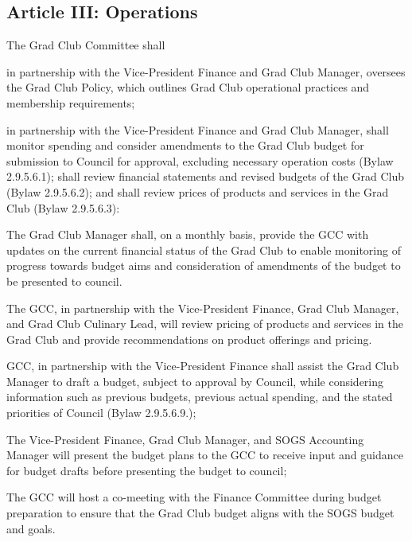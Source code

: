 \subsection{Article III: Operations}
\begin{longenum}[ label*=\thesubsection.\arabic*., align=left] 
\item The Grad Club Committee shall
	\begin{longenum}[ label*=\arabic*., align=left]
	\item in partnership with the Vice-President Finance and Grad Club Manager, oversees the Grad Club Policy, which outlines Grad Club operational practices and membership requirements;
	\item in partnership with the Vice-President Finance and Grad Club Manager, shall monitor spending and consider amendments to the Grad Club budget for submission to Council for approval, excluding necessary operation costs (Bylaw 2.9.5.6.1); shall review financial statements and revised budgets of the Grad Club (Bylaw 2.9.5.6.2); and shall review prices of products and services in the Grad Club (Bylaw 2.9.5.6.3):
		\begin{longenum}[ label*=\arabic*., align=left]
		\item The Grad Club Manager shall, on a monthly basis, provide the GCC with updates on the current financial status of the Grad Club to enable monitoring of progress towards budget aims and consideration of amendments of the budget to be presented to council.
		\item The GCC, in partnership with the Vice-President Finance, Grad Club Manager, and Grad Club Culinary Lead, will review pricing of products and services in the Grad Club and provide recommendations on product offerings and pricing.
		\end{longenum}
	\item GCC, in partnership with the Vice-President Finance shall assist the Grad Club Manager to draft a budget, subject to approval by Council, while considering information such as previous budgets, previous actual spending, and the stated priorities of Council (Bylaw 2.9.5.6.9.);
		\begin{longenum}[ label*=\arabic*., align=left]
		\item The Vice-President Finance, Grad Club Manager, and SOGS Accounting Manager will present the budget plans to the GCC to receive input and guidance for budget drafts before presenting the budget to council;
		\item The GCC will host a co-meeting with the Finance Committee during budget preparation to ensure that the Grad Club budget aligns with the SOGS budget and goals.

\end{longenum}
\end{longenum}
\end{longenum}
